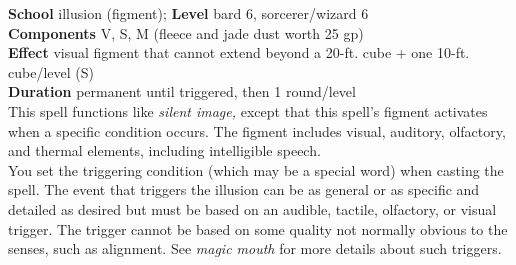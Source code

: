 \textbf{School} illusion (figment); \textbf{Level} bard 6, sorcerer/wizard 6\\
\textbf{Components} V, S, M (fleece and jade dust worth 25 gp)\\
\textbf{Effect} visual figment that cannot extend beyond a 20-ft. cube + one 10-ft. cube/level (S)\\
\textbf{Duration} permanent until triggered, then 1 round/level\\
This spell functions like \textit{silent image, }except that this spell's figment activates when a specific condition occurs. The figment includes visual, auditory, olfactory, and thermal elements, including intelligible speech.\\
You set the triggering condition (which may be a special word) when casting the spell. The event that triggers the illusion can be as general or as specific and detailed as desired but must be based on an audible, tactile, olfactory, or visual trigger. The trigger cannot be based on some quality not normally obvious to the senses, such as alignment. See \textit{magic mouth }for more details about such triggers.\\
